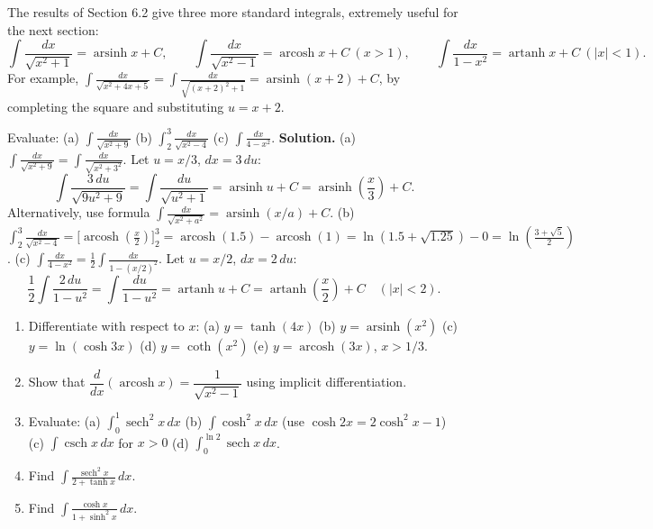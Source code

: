 \documentclass[11pt]{article}
\begin{document}
\begin{exemplebox}
The results of Section 6.2 give three more standard integrals, extremely useful for the next section:
\[
\int \frac{dx}{\sqrt{x^2+1}} = \operatorname{arsinh} x + C, \qquad
\int \frac{dx}{\sqrt{x^2-1}} = \operatorname{arcosh} x + C \ (x>1), \qquad
\int \frac{dx}{1-x^2} = \operatorname{artanh} x + C \ (|x|<1).
\]
For example, $\displaystyle\int \frac{dx}{\sqrt{x^2+4x+5}} = \int \frac{dx}{\sqrt{(x+2)^2+1}} = \operatorname{arsinh}(x+2) + C$, by completing the square and substituting $u = x+2$.
\end{exemplebox}

\begin{exoresolu}
Evaluate:
\quad (a) $\displaystyle\int \frac{dx}{\sqrt{x^2+9}}$
\quad (b) $\displaystyle\int_2^3 \frac{dx}{\sqrt{x^2-4}}$
\quad (c) $\displaystyle\int \frac{dx}{4-x^2}$.
\tcblower
\textbf{Solution.}
(a) $\displaystyle\int \frac{dx}{\sqrt{x^2+9}} = \int \frac{dx}{\sqrt{x^2+3^2}}$. Let $u = x/3$, $dx = 3\,du$:
\[
\int \frac{3\,du}{\sqrt{9u^2+9}} = \int \frac{du}{\sqrt{u^2+1}} = \operatorname{arsinh} u + C = \operatorname{arsinh}\left(\frac{x}{3}\right) + C.
\]
Alternatively, use formula $\int \frac{dx}{\sqrt{x^2+a^2}} = \operatorname{arsinh}(x/a) + C$.
(b) $\displaystyle\int_2^3 \frac{dx}{\sqrt{x^2-4}} = \Big[\operatorname{arcosh}\left(\frac{x}{2}\right)\Big]_2^3 = \operatorname{arcosh}(1.5) - \operatorname{arcosh}(1) = \ln\left(1.5 + \sqrt{1.25}\right) - 0 = \ln\left(\frac{3+\sqrt{5}}{2}\right)$.
(c) $\displaystyle\int \frac{dx}{4-x^2} = \frac{1}{2}\int \frac{dx}{1-(x/2)^2}$. Let $u = x/2$, $dx = 2\,du$:
\[
\frac{1}{2}\int \frac{2\,du}{1-u^2} = \int \frac{du}{1-u^2} = \operatorname{artanh} u + C = \operatorname{artanh}\left(\frac{x}{2}\right) + C \quad (|x|<2).
\]
\end{exoresolu}

\begin{exercice}[Consolidation]
\begin{enumerate}
\item Differentiate with respect to $x$:
      (a) $y = \tanh(4x)$
      (b) $y = \operatorname{arsinh}(x^2)$
      (c) $y = \ln(\cosh 3x)$
      (d) $y = \coth(x^2)$
      (e) $y = \operatorname{arcosh}(3x)$, $x > 1/3$.
\item Show that $\dfrac{d}{dx}\left(\operatorname{arcosh} x\right) = \dfrac{1}{\sqrt{x^2-1}}$ using implicit differentiation.
\item Evaluate:
      (a) $\displaystyle\int_0^1 \operatorname{sech}^2 x \, dx$
      (b) $\displaystyle\int \cosh^2 x \, dx$ (use $\cosh 2x = 2\cosh^2 x - 1$)
      (c) $\displaystyle\int \operatorname{csch} x \, dx$ for $x > 0$
      (d) $\displaystyle\int_0^{\ln 2} \operatorname{sech} x \, dx$.
\item Find $\displaystyle\int \frac{\operatorname{sech}^2 x}{2 + \tanh x}\,dx$.
\item Find $\displaystyle\int \frac{\cosh x}{1+\sinh^2 x}\,dx$.
\end{enumerate}
\end{exercice}
\end{document}
